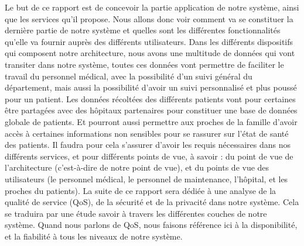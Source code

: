 Le but de ce rapport est de concevoir la partie application de notre système, ainsi que les services qu’il propose. Nous allons
donc voir comment va se constituer la dernière partie de notre système et quelles sont les différentes fonctionnalités qu’elle va
fournir auprès des différents utilisateurs. Dans les différents dispositifs qui composent notre architecture, nous avons une
multitude de données qui vont transiter dans notre système, toutes ces données vont permettre de faciliter le travail du personnel
médical, avec la possibilité d’un suivi général du département, mais aussi la possibilité d’avoir un suivi personnalisé et plus
poussé pour un patient. Les données récoltées des différents patients vont pour certaines être partagées avec des hôpitaux
partenaires pour constituer une base de données globale de patients. Et pourront aussi permettre aux proches de la famille d’avoir
accès à certaines informations non sensibles pour se rassurer sur l'état de santé des patients. Il faudra pour cela s’assurer
d’avoir les requis nécessaires dans nos différents services, et pour différents points de vue, à savoir : du point de vue de
l’architecture (c’est-à-dire de notre point de vue), et du points de vue des utilisateurs (le personnel médical, le personnel de
maintenance, l’hôpital, et les proches du patients). La suite de ce rapport sera dédiée à une analyse de la qualité de service
(QoS), de la sécurité et de la privacité dans notre système. Cela se traduira par une étude savoir à travers les différentes
couches de notre système. Quand nous parlons de QoS, nous faisons référence ici à la disponibilité, et la fiabilité à tous les
niveaux de notre système. 
